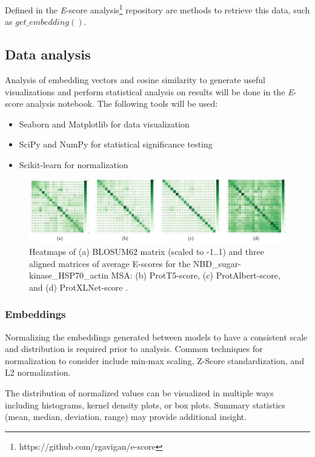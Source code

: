\documentclass[
	letterpaper, %
	10pt, %
]{journalArticle}
\begin{document}
Defined in the \textit{E}-score analysis\footnote{https://github.com/rgavigan/e-score} repository are methods to retrieve this data, such as \(get\_embedding()\).

\subsection{Data analysis}
Analysis of embedding vectors and cosine similarity to generate useful visualizations and perform statistical analysis on results will be done in the \textit{E}-score analysis notebook. The following tools will be used:
\begin{itemize}
    \item{Seaborn \autocite{Waskom:2021} and Matplotlib \autocite{Hunter:2007} for data visualization}
    \item{SciPy \autocite{Virtanen:2020} and NumPy \autocite{Harris:2020} for statistical significance testing}
    \item{Scikit-learn \autocite{Pedregosa:2011} for normalization}
\end{itemize}

\begin{figure} %
	\includegraphics[width=\linewidth]{Figures/Escorematrices.jpeg}
	\caption{Heatmaps of (a) BLOSUM62 matrix (scaled to -1..1) and three aligned matrices of average E-scores for the NBD\_sugar-kinase\_HSP70\_actin MSA: (b) ProtT5-score, (c) ProtAlbert-score, and (d) ProtXLNet-score \autocite{Ashrafzadeh:2023}.}
	\label{fig:escoreheatmap}
\end{figure}

\subsubsection{Embeddings}
Normalizing the embeddings generated between models to have a consistent scale and distribution is required prior to analysis. Common techniques for normalization to consider include min-max scaling, Z-Score standardization, and L2 normalization.

The distribution of normalized values can be visualized in multiple ways including histograms, kernel density plots, or box plots. Summary statistics (mean, median, deviation, range) may provide additional insight.
\end{document}

